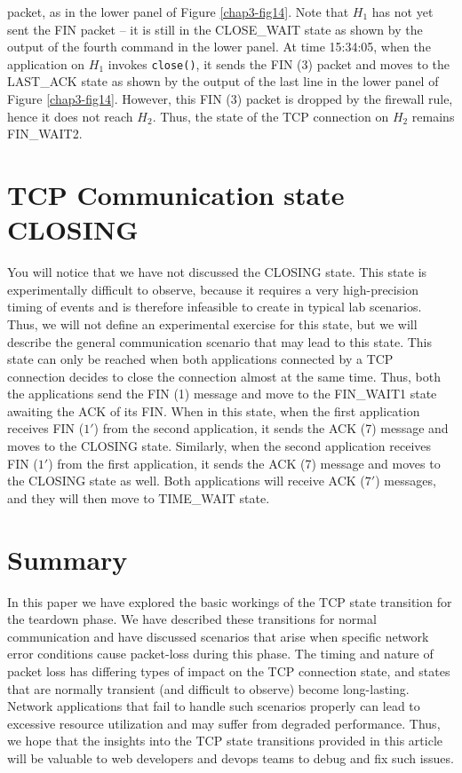 \begin{multicols}{2}
\noindent
packet, as in the lower panel of Figure \ref{chap3-fig14}. Note that $H_{1}$ has not yet sent the FIN packet -- it is still in the CLOSE\_WAIT state as shown by the output of the fourth command in the lower panel. At time 15:34:05, when the application on $H_{1}$ invokes \lstinline|close()|, it sends the FIN (3) packet and moves to the LAST\_ACK state as shown by the output of the last line in the lower panel of Figure \ref{chap3-fig14}. However, this FIN (3) packet is dropped by the firewall rule, hence it does not reach $H_{2}$. Thus, the state of the TCP connection on $H_{2}$ remains FIN\_WAIT2.

\section{TCP Communication state CLOSING}

You will notice that we have not discussed the CLOSING state. This state is experimentally difficult to observe, because it requires a very high-precision timing of events and is therefore infeasible to create in typical lab scenarios. Thus, we will not define an experimental exercise for this state, but we will describe the general communication scenario that may lead to this state. This state can only be reached when both applications connected by a TCP connection decides to close the connection almost at the same time. Thus, both the applications send the FIN (1) message and move to the FIN\_WAIT1 state awaiting the ACK of its FIN. When in this state, when the first application receives FIN ($1'$) from the second application, it sends the ACK (7) message and moves to the CLOSING state. Similarly, when the second application receives FIN ($1'$) from the first application, it sends the ACK (7) message and moves to the CLOSING state as well. Both applications will receive ACK ($7'$) messages, and they will then move to TIME\_WAIT state.

\section{Summary}

In this paper we have explored the basic workings of the TCP state transition for the teardown phase. We have described these transitions for normal communication and have discussed scenarios that arise when specific network error conditions cause packet-loss during this phase. The timing and nature of packet loss has differing types of impact on the TCP connection state, and states that are normally transient (and difficult to observe) become long-lasting. Network applications that fail to handle such scenarios properly can lead to excessive resource utilization and may suffer from degraded performance. Thus, we hope that the insights into the TCP state transitions provided in this article will be valuable to web developers and devops teams to debug and fix such issues.


\end{multicols}

